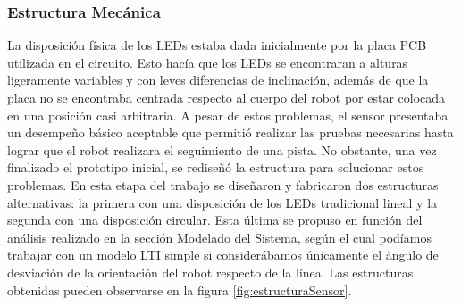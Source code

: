 \documentclass[10pt,conference,a4paper,onecolumn]{article}%
\begin{document}
\subsubsection{Estructura Mecánica}
La disposición física de los LEDs estaba dada inicialmente por la placa PCB utilizada en el circuito. Esto hacía que los LEDs se encontraran a alturas ligeramente variables y con leves diferencias de inclinación, además de que la placa no se encontraba centrada respecto al cuerpo del robot por estar colocada en una posición
casi arbitraria. A pesar de estos problemas, el sensor presentaba un desempeño básico aceptable que permitió realizar las pruebas necesarias hasta lograr que el robot realizara el seguimiento de una pista. No obstante, una vez finalizado el prototipo inicial, se rediseñó la estructura para solucionar estos problemas. En esta etapa
del trabajo se diseñaron y fabricaron dos estructuras alternativas: la primera con una disposición de los LEDs tradicional lineal y la segunda con una disposición circular. Esta última se propuso en función del análisis realizado en la sección Modelado del Sistema, según el cual podíamos trabajar con un modelo LTI simple
si considerábamos únicamente el ángulo de desviación de la orientación del robot respecto de la línea. Las estructuras obtenidas pueden observarse en la figura \ref{fig:estructuraSensor}. 
\end{document}
